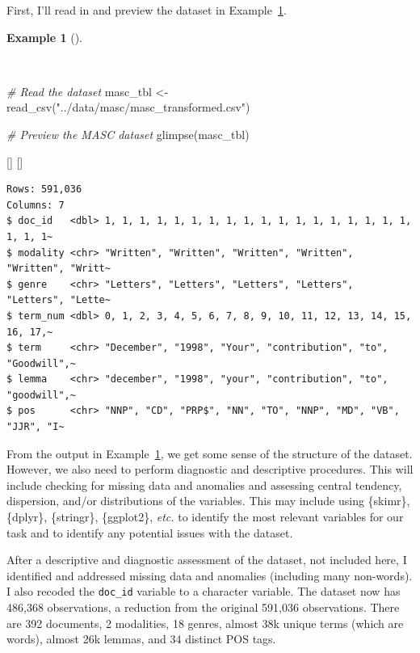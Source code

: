 \documentclass[
  letterpaper,
  krantz1]{latex/krantz-mod}
\newenvironment{Shaded}{\begin{snugshade}}{\end{snugshade}}
\newcommand{\CommentTok}[1]{\textcolor[rgb]{0.00,0.00,0.00}{\textit{#1}}}
\newcommand{\FunctionTok}[1]{\textcolor[rgb]{0.00,0.00,0.00}{#1}}
\newcommand{\NormalTok}[1]{\textcolor[rgb]{0.00,0.00,0.00}{#1}}
\newcommand{\OtherTok}[1]{\textcolor[rgb]{0.00,0.00,0.00}{#1}}
\newcommand{\StringTok}[1]{\textcolor[rgb]{0.00,0.00,0.00}{#1}}
\newcommand{\cindex}[1]{%
  \StrSubstitute{#1}{_}{\_}[\temp]%
  \index{\temp}%
}
\theoremstyle{definition}
\theoremstyle{definition}
\newtheorem{example}{Example}[chapter]
\theoremstyle{remark}
\begin{document}
First, I'll read in and preview the dataset in
Example~\ref{exm-explore-masc-read}.

\begin{example}[]\protect\hypertarget{exm-explore-masc-read}{}\label{exm-explore-masc-read}

~

\begin{Shaded}
\begin{Highlighting}[numbers=left,,]
\CommentTok{\# Read the dataset}
\NormalTok{masc\_tbl }\OtherTok{\textless{}{-}}
  \FunctionTok{read\_csv}\NormalTok{(}\StringTok{"../data/masc/masc\_transformed.csv"}\NormalTok{)}

\CommentTok{\# Preview the MASC dataset}
\FunctionTok{glimpse}\NormalTok{(masc\_tbl)}
\end{Highlighting}
\end{Shaded}

\end{example}

\cindex{read_csv()}\cindex{glimpse()}

\vspace{1em}

\begin{verbatim}
Rows: 591,036
Columns: 7
$ doc_id   <dbl> 1, 1, 1, 1, 1, 1, 1, 1, 1, 1, 1, 1, 1, 1, 1, 1, 1, 1, 1, 1, 1~
$ modality <chr> "Written", "Written", "Written", "Written", "Written", "Writt~
$ genre    <chr> "Letters", "Letters", "Letters", "Letters", "Letters", "Lette~
$ term_num <dbl> 0, 1, 2, 3, 4, 5, 6, 7, 8, 9, 10, 11, 12, 13, 14, 15, 16, 17,~
$ term     <chr> "December", "1998", "Your", "contribution", "to", "Goodwill",~
$ lemma    <chr> "december", "1998", "your", "contribution", "to", "goodwill",~
$ pos      <chr> "NNP", "CD", "PRP$", "NN", "TO", "NNP", "MD", "VB", "JJR", "I~
\end{verbatim}

From the output in Example~\ref{exm-explore-masc-read}, we get some
sense of the structure of the dataset. However, we also need to perform
diagnostic and descriptive procedures.
This will include checking for missing data and anomalies and assessing
central tendency, dispersion, and/or distributions of the variables.
This may include using \{skimr\}, \{dplyr\}, \{stringr\}, \{ggplot2\},
\emph{etc.} to identify the most relevant variables for our task and to
identify any potential issues with the dataset.

After a descriptive and diagnostic assessment of the
dataset, not included here, I identified
and addressed missing data and anomalies (including
many non-words). I also recoded the
\texttt{doc\_id} variable to a character
variable. The dataset now has 486,368
observations, a reduction from the original 591,036 observations. There
are 392 documents, 2 modalities, 18 genres, almost 38k unique
terms (which are words), almost 26k lemmas,
and 34 distinct POS tags.
\end{document}

